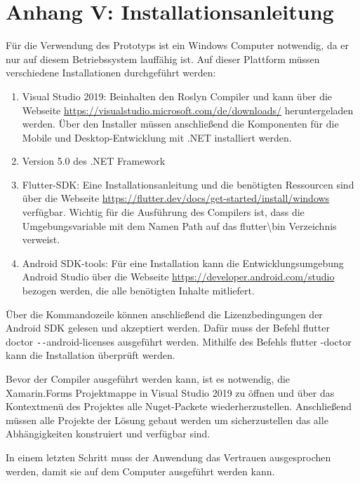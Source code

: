 \chapter{Anhang V: Installationsanleitung}
\label{chap:Installationsanleitung}

Für die Verwendung des Prototyps ist ein Windows Computer notwendig,  da er nur auf diesem Betriebssystem lauffähig ist.  
Auf dieser Plattform müssen verschiedene Installationen durchgeführt werden:

\begin{enumerate}
\setlength\itemsep{-0.6em}
	\item Visual Studio 2019: Beinhalten den Roslyn Compiler und kann über die Webseite \url{https://visualstudio.microsoft.com/de/downloads/} heruntergeladen werden.  Über den Installer müssen anschließend die Komponenten für die Mobile und Desktop-Entwicklung mit .NET installiert werden.	
	\item Version 5.0 des .NET Framework
	\item Flutter-SDK:  Eine Installationsanleitung und die benötigten Ressourcen sind über die Webseite \url{https://flutter.dev/docs/get-started/install/windows} verfügbar.  Wichtig für die Ausführung des Compilers ist,  dass die Umgebungsvariable mit dem Namen \glq Path\grq{}  auf das \glqq flutter\textbackslash bin\grqq{} Verzeichnis verweist. 
	\item Android SDK-tools: Für eine Installation kann die Entwicklungsumgebung Android Studio über die Webseite \url{https://developer.android.com/studio} bezogen werden,  die alle benötigten Inhalte mitliefert. 
 
\end{enumerate}


Über die Kommandozeile können anschließend die Lizenzbedingungen der Android SDK gelesen und akzeptiert werden.  Dafür muss der Befehl \glqq flutter doctor \texttt{-{}-}android-licenses\grqq{} ausgeführt werden.  Mithilfe des  Befehls \glqq flutter -doctor\grqq{} kann die Installation überprüft werden.

Bevor der Compiler ausgeführt werden kann,  ist es notwendig,  die Xamarin.Forms Projektmappe in Visual Studio 2019 zu öffnen und über das Kontextmenü des Projektes alle Nuget-Packete wiederherzustellen.  Anschließend müssen alle Projekte der Lösung gebaut werden um sicherzustellen das alle Abhängigkeiten konstruiert und verfügbar sind. 

In einem letzten Schritt muss der Anwendung das Vertrauen ausgesprochen werden, damit sie auf dem Computer ausgeführt werden kann.
